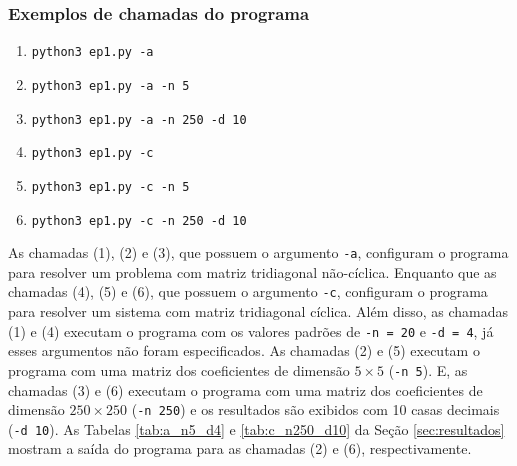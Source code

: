 \documentclass[a4,12pt]{horizon-theme}
\begin{document}
\subsubsection{Exemplos de chamadas do programa}
\label{sec:exemplos}

\begin{enumerate}
  \item \texttt{python3 ep1.py -a}
  \item \texttt{python3 ep1.py -a -n 5}
  \item \texttt{python3 ep1.py -a -n 250 -d 10}
  \item \texttt{python3 ep1.py -c}
  \item \texttt{python3 ep1.py -c -n 5}
  \item \texttt{python3 ep1.py -c -n 250 -d 10}
\end{enumerate}


As chamadas (1), (2) e (3), que possuem o argumento \texttt{-a}, configuram o programa para resolver um problema com matriz tridiagonal não-cíclica. Enquanto que as chamadas (4), (5) e (6), que possuem o argumento \texttt{-c}, configuram o programa para resolver um sistema com matriz tridiagonal cíclica. Além disso, as chamadas (1) e (4) executam o programa com os valores padrões de \texttt{-n = 20} e \texttt{-d = 4}, já esses argumentos não foram especificados. As chamadas (2) e (5) executam o programa com uma matriz dos coeficientes de dimensão $5 \times 5$ (\texttt{-n 5}). E, as chamadas (3) e (6) executam o programa com uma matriz dos coeficientes de dimensão $250 \times 250$ (\texttt{-n 250}) e os resultados são exibidos com 10 casas decimais (\texttt{-d 10}). As Tabelas \ref{tab:a_n5_d4} e \ref{tab:c_n250_d10} da Seção \ref{sec:resultados} mostram a saída do programa para as chamadas (2) e (6), respectivamente.
\end{document}
